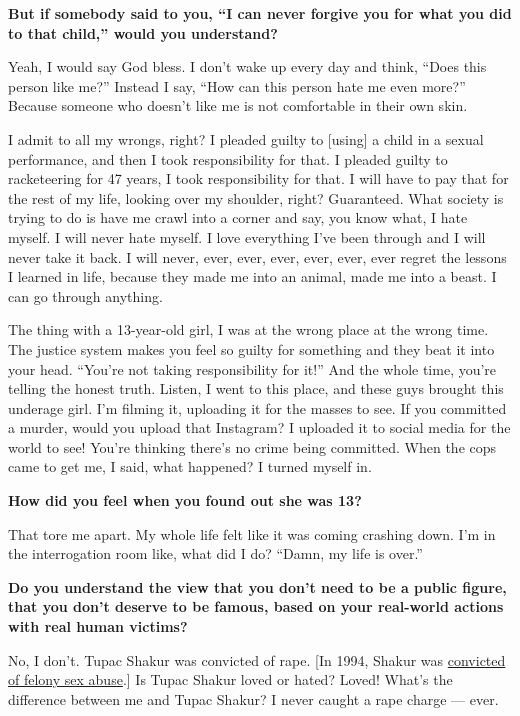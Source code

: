 \textbf{But if somebody said to you, ``I can never forgive you for what
you did to that child,'' would you understand?}

Yeah, I would say God bless. I don't wake up every day and think, ``Does
this person like me?'' Instead I say, ``How can this person hate me even
more?'' Because someone who doesn't like me is not comfortable in their
own skin.

I admit to all my wrongs, right? I pleaded guilty to {[}using{]} a child
in a sexual performance, and then I took responsibility for that. I
pleaded guilty to racketeering for 47 years, I took responsibility for
that. I will have to pay that for the rest of my life, looking over my
shoulder, right? Guaranteed. What society is trying to do is have me
crawl into a corner and say, you know what, I hate myself. I will never
hate myself. I love everything I've been through and I will never take
it back. I will never, ever, ever, ever, ever, ever, ever regret the
lessons I learned in life, because they made me into an animal, made me
into a beast. I can go through anything.

The thing with a 13-year-old girl, I was at the wrong place at the wrong
time. The justice system makes you feel so guilty for something and they
beat it into your head. ``You're not taking responsibility for it!'' And
the whole time, you're telling the honest truth. Listen, I went to this
place, and these guys brought this underage girl. I'm filming it,
uploading it for the masses to see. If you committed a murder, would you
upload that Instagram? I uploaded it to social media for the world to
see! You're thinking there's no crime being committed. When the cops
came to get me, I said, what happened? I turned myself in.

\textbf{How did you feel when you found out she was 13?}

That tore me apart. My whole life felt like it was coming crashing down.
I'm in the interrogation room like, what did I do? ``Damn, my life is
over.''

\textbf{Do you understand the view that you don't need to be a public
figure, that you don't deserve to be famous, based on your real-world
actions with real human victims?}

No, I don't. Tupac Shakur was convicted of rape. {[}In 1994, Shakur was
\href{https://www.nytimes3xbfgragh.onion/1994/12/02/nyregion/wounded-rapper-gets-mixed-verdict-in-sex-abuse-case.html}{convicted
of felony sex abuse}.{]} Is Tupac Shakur loved or hated? Loved! What's
the difference between me and Tupac Shakur? I never caught a rape charge
--- ever.

